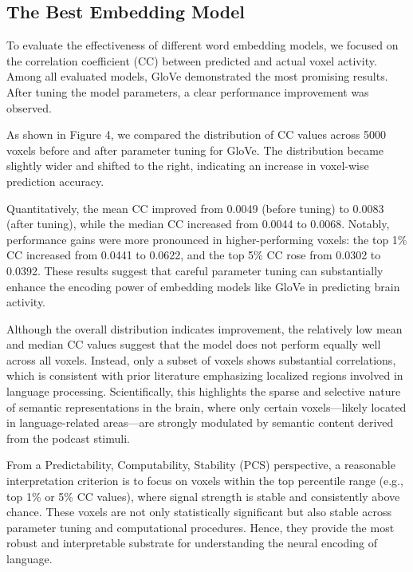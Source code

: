 \documentclass[11pt,letterpaper]{article}
\begin{document}
\vspace{1em} %
\subsection{The Best Embedding Model}
\vspace{0.5em} %

To evaluate the effectiveness of different word embedding models, we focused on the correlation coefficient (CC) between predicted and actual voxel activity. Among all evaluated models, GloVe demonstrated the most promising results. After tuning the model parameters, a clear performance improvement was observed.

As shown in Figure 4, we compared the distribution of CC values across 5000 voxels before and after parameter tuning for GloVe. The distribution became slightly wider and shifted to the right, indicating an increase in voxel-wise prediction accuracy.

Quantitatively, the mean CC improved from 0.0049 (before tuning) to 0.0083 (after tuning), while the median CC increased from 0.0044 to 0.0068. Notably, performance gains were more pronounced in higher-performing voxels: the top 1\% CC increased from 0.0441 to 0.0622, and the top 5\% CC rose from 0.0302 to 0.0392. These results suggest that careful parameter tuning can substantially enhance the encoding power of embedding models like GloVe in predicting brain activity.

Although the overall distribution indicates improvement, the relatively low mean and median CC values suggest that the model does not perform equally well across all voxels. Instead, only a subset of voxels shows substantial correlations, which is consistent with prior literature emphasizing localized regions involved in language processing. Scientifically, this highlights the sparse and selective nature of semantic representations in the brain, where only certain voxels—likely located in language-related areas—are strongly modulated by semantic content derived from the podcast stimuli.

From a Predictability, Computability, Stability (PCS) perspective, a reasonable interpretation criterion is to focus on voxels within the top percentile range (e.g., top 1\% or 5\% CC values), where signal strength is stable and consistently above chance. These voxels are not only statistically significant but also stable across parameter tuning and computational procedures. Hence, they provide the most robust and interpretable substrate for understanding the neural encoding of language.
\end{document}

